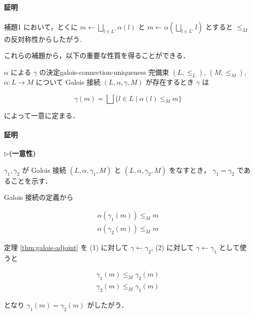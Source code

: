 \documentclass[uplatex]{jsarticle}
\newenvironment{proofpart}[1]
  {\par\vspace{1em}\noindent\hspace{10pt}$\triangleright$\hspace{5pt}\textbf{#1}\\[0.3em]
   \hspace{10pt}\begin{tcolorbox}[enhanced,
     left=20pt, right=0pt, top=3pt, bottom=3pt,
     colback=white,
     colframe=white,
     leftrule=0.3pt,
     rightrule=0pt,
     toprule=0pt,
     bottomrule=0pt,
     sharp corners,
     boxsep=0pt,
     before skip=0pt,
     after skip=1em
   ]}
  {\end{tcolorbox}}
\begin{document}
\paragraph*{証明}

補題1 において，とくに $m \leftarrow \bigsqcup_{l \in L'} \alpha(l)$ と $m \leftarrow \alpha\left( \bigsqcup_{l \in L'} l \right)$ とすると
$\leq_M$ の反対称性からしたがう.


これらの補題から，以下の重要な性質を得ることができる．


\begin{boxtheorem}{$\alpha$ による $\gamma$ の決定}{galois-connection-uniqueness}
  完備束 $(L, \leq_L)$, $(M, \leq_M)$, $\alpha: L \to M$ について
  Galois 接続 $(L, \alpha, \gamma, M)$ が存在するとき $\gamma$ は

  $$
    \gamma(m) = \bigsqcup \{ l \in L \mid \alpha(l) \leq_M m \}
  $$

  によって一意に定まる．
\end{boxtheorem}

\paragraph*{証明}

\begin{proofpart}{(一意性)}

  $\gamma_1, \gamma_2$ が Galois 接続 $(L, \alpha, \gamma_1, M)$ と $(L, \alpha, \gamma_2, M)$ をなすとき， $\gamma_1 = \gamma_2$ であることを示す．

  Galois 接続の定義から

  \begin{align}
    \alpha(\gamma_1(m)) \leq_M m \\
    \alpha(\gamma_2(m)) \leq_M m
  \end{align}

  定理 \ref{thm:galois-adjoint} を
  (1) に対して $\gamma \leftarrow \gamma_2$,
  (2) に対して $\gamma \leftarrow \gamma_1$ として使うと


  \begin{align*}
    \gamma_1(m) \leq_M \gamma_2(m) \\
    \gamma_2(m) \leq_M \gamma_1(m)
  \end{align*}

  となり $\gamma_1(m) = \gamma_2(m)$ がしたがう．

\end{proofpart}
\end{document}

